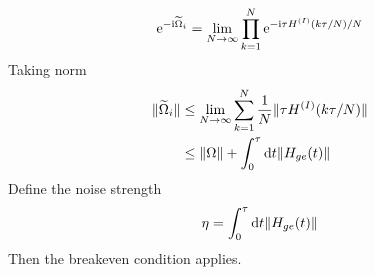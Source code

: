 \documentclass[b5paper,11pt]{article}
\newcommand{\wt}[1]{\widetilde{#1}}
\begin{document}
\begin{equation}
 \upe^{-\upi \wt \Omega_i} = \lim_{N\to\infty} \prod_{k=1}^N 
 \upe^{-\upi \tau H\up{I}(k \tau/N)/N}
\end{equation}
Taking norm 
\begin{equation}
\begin{split}
 \norm{\wt \Omega_i} &\le \lim_{N\to\infty}\sum_{k=1}^N \frac{1}{N} \norm{\tau H\up{I}(k \tau/N)}\\
 &\le \norm{\Omega} + \int_0^\tau \dd t \norm{H_{ge}(t)}
\end{split}
\end{equation}
Define the noise strength
\begin{equation}
\eta =  \int_0^\tau \mathop{}\!\mathrm{d} t \Vert {H_{ge}(t)} \Vert
\end{equation}
Then the breakeven condition applies.

\end{document}
